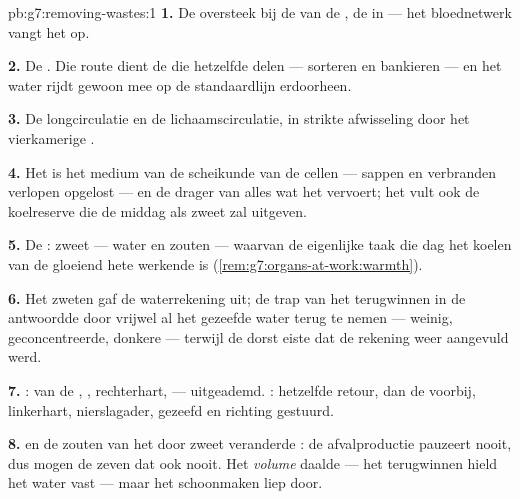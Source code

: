 \begin{solution}{pb:g7:removing-wastes:1}
\textbf{1.} De oversteek bij de  van de , de
 in --- het bloednetwerk vangt het op.

\textbf{2.} De . Die route dient de  die hetzelfde
 delen --- sorteren en bankieren --- en het water rijdt gewoon mee op
de standaardlijn erdoorheen.

\textbf{3.} De longcirculatie en de lichaamscirculatie, in strikte
afwisseling door het vierkamerige .

\textbf{4.} Het is het medium van de scheikunde van de cellen --- sappen
en verbranden verlopen opgelost --- en de drager van alles wat het 
vervoert; het vult ook de koelreserve die de middag als zweet zal uitgeven.

\textbf{5.} De : zweet --- water en zouten --- waarvan de eigenlijke
taak die dag het koelen van de gloeiend hete werkende  is
(\cref{rem:g7:organs-at-work:warmth}).

\textbf{6.} Het zweten gaf de waterrekening uit; de trap van het
terugwinnen in de  antwoordde door vrijwel al het gezeefde water
terug te nemen --- weinig, geconcentreerde, donkere  --- terwijl de
dorst eiste dat de rekening weer aangevuld werd.

\textbf{7.} :  van de , , rechterhart,
 --- uitgeademd. : hetzelfde retour, dan de 
voorbij, linkerhart, nierslagader, gezeefd en richting  gestuurd.

\textbf{8.}  en de zouten van het door zweet veranderde : de
afvalproductie pauzeert nooit, dus mogen de zeven dat ook nooit. Het
\emph{volume}  daalde --- het terugwinnen hield het water vast ---
maar het schoonmaken liep door.


\end{solution}
